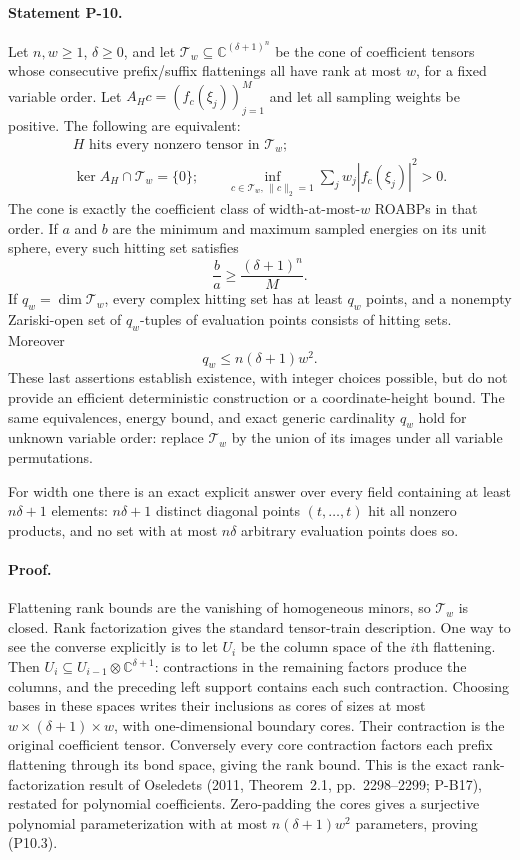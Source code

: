 \paragraph{Statement P-10.}
Let $n,w\ge1$, $\delta\ge0$, and let $\mathcal T_w\subseteq\mathbb C^{(\delta+1)^n}$ be the cone of coefficient tensors whose consecutive prefix/suffix flattenings all have rank at most $w$, for a fixed variable order. Let $A_Hc=(f_c(\xi_j))_{j=1}^M$ and let all sampling weights be positive. The following are equivalent:
\[
\begin{gathered}
 H\text{ hits every nonzero tensor in }\mathcal T_w;\\
 \ker A_H\cap\mathcal T_w=\{0\};\qquad
 \inf_{c\in\mathcal T_w,\,\|c\|_2=1}
       \sum_jw_j|f_c(\xi_j)|^2>0.
\end{gathered}
 \tag{P10.1}
\]
The cone is exactly the coefficient class of width-at-most-$w$ ROABPs in that order. If $a$ and $b$ are the minimum and maximum sampled energies on its unit sphere, every such hitting set satisfies
\[
 \frac ba\ge\frac{(\delta+1)^n}{M}.
 \tag{P10.2}
\]
If $q_w=\dim\mathcal T_w$, every complex hitting set has at least $q_w$ points, and a nonempty Zariski-open set of $q_w$-tuples of evaluation points consists of hitting sets. Moreover
\[
 q_w\le n(\delta+1)w^2.
 \tag{P10.3}
\]
These last assertions establish existence, with integer choices possible, but do not provide an efficient deterministic construction or a coordinate-height bound.
The same equivalences, energy bound, and exact generic cardinality $q_w$ hold for unknown variable order: replace $\mathcal T_w$ by the union of its images under all variable permutations.

For width one there is an exact explicit answer over every field containing at least $n\delta+1$ elements: $n\delta+1$ distinct diagonal points $(t,\ldots,t)$ hit all nonzero products, and no set with at most $n\delta$ arbitrary evaluation points does so.
\paragraph{Proof.}
Flattening rank bounds are the vanishing of homogeneous minors, so $\mathcal T_w$ is closed. Rank factorization gives the standard tensor-train description. One way to see the converse explicitly is to let $U_i$ be the column space of the $i$th flattening. Then
$U_i\subseteq U_{i-1}\otimes\mathbb C^{\delta+1}$: contractions in the remaining factors produce the columns, and the preceding left support contains each such contraction. Choosing bases in these spaces writes their inclusions as cores of sizes at most $w\times(\delta+1)\times w$, with one-dimensional boundary cores. Their contraction is the original coefficient tensor. Conversely every core contraction factors each prefix flattening through its bond space, giving the rank bound. This is the exact rank-factorization result of Oseledets (2011, Theorem~2.1, pp.~2298--2299; P-B17), restated for polynomial coefficients. Zero-padding the cores gives a surjective polynomial parameterization with at most $n(\delta+1)w^2$ parameters, proving (P10.3).

